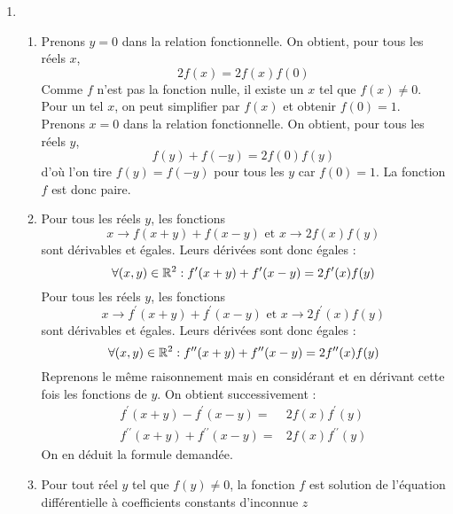 \begin{enumerate}
 \item \begin{enumerate}
 \item Prenons $y=0$ dans la relation fonctionnelle. On obtient, pour tous les réels $x$,
\begin{displaymath}
 2f(x)=2f(x)f(0)
\end{displaymath}
Comme $f$ n'est pas la fonction nulle, il existe un $x$ tel que $f(x)\neq 0$. Pour un tel $x$, on peut simplifier par $f(x)$ et obtenir $f(0)=1$.\newline
Prenons $x=0$ dans la relation fonctionnelle. On obtient, pour tous les réels $y$,
\begin{displaymath}
 f(y)+f(-y)=2f(0)f(y)
\end{displaymath}
d'où l'on tire $f(y)=f(-y)$ pour tous les $y$ car $f(0)=1$. La fonction $f$ est donc paire.
\item Pour tous les réels $y$, les fonctions
\begin{displaymath}
 x\rightarrow f(x+y)+f(x-y) \text{ et } x\rightarrow 2f(x)f(y)
\end{displaymath}
sont dérivables et égales. Leurs dérivées sont donc égales :
\begin{displaymath}
 \forall (x,y)\in \mathbb{R}^2 : f^\prime(x+y) + f^\prime(x-y) = 2f^\prime(x)f(y)
\end{displaymath}
Pour tous les réels $y$, les fonctions
\begin{displaymath}
 x\rightarrow f^\prime(x+y)+f^\prime(x-y) \text{ et } x\rightarrow 2f^\prime(x)f(y)
\end{displaymath}
sont dérivables et égales. Leurs dérivées sont donc égales :
\begin{displaymath}
 \forall (x,y)\in \mathbb{R}^2 : f^{\prime\prime}(x+y) + f^{\prime\prime}(x-y) = 2f^{\prime\prime}(x)f(y)
\end{displaymath}
Reprenons le même raisonnement mais en considérant et en dérivant cette fois les fonctions de $y$. On obtient successivement :
\begin{align*}
 f^\prime(x+y)-f^\prime(x-y) =& 2f(x)f^\prime(y)\\
f^{\prime\prime}(x+y)+f^{\prime\prime}(x-y) =& 2f(x)f^{\prime\prime}(y)
\end{align*}
On en déduit la formule demandée.
\item Pour tout réel $y$ tel que $f(y)\neq 0$, la fonction $f$ est solution de l'équation différentielle à coefficients constants d'inconnue $z$
\begin{displaymath}

\end{displaymath}
\end{enumerate}
\end{enumerate}
